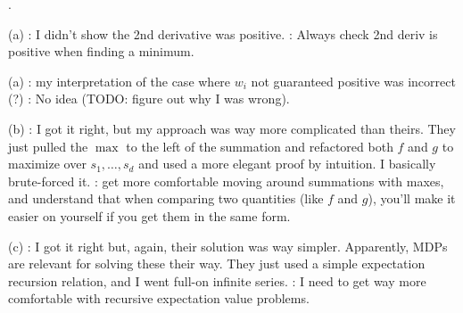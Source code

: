 \documentclass[11pt]{article}
\newcommand\myspace[1][]{\vspace{#1\bigskipamount}\Needspace{10\baselineskip}}
\newcommand\p{\Needspace{10\baselineskip} \noindent}
\begin{document}
\myspace
\p {}. 
\begin{compactitem}
	\item[(a)] : I didn't show the 2nd derivative was positive. : Always check 2nd deriv is positive when finding a minimum. 

	\item [(a)] : my interpretation of the case where $w_i$ not guaranteed positive was incorrect (?) : No idea (TODO: figure out why I was wrong). 
	
	\item [(b)] : I got it right, but my approach was way more complicated than theirs. They just pulled the $\max$ to the left of the summation and refactored both $f$ and $g$ to maximize over $s_1, \ldots, s_d$ and used a more elegant proof by intuition. I basically brute-forced it. : get more comfortable moving around summations with maxes, and understand that when comparing two quantities (like $f$ and $g$), you'll make it easier on yourself if you get them in the same form. 
	
	\item [(c)] : I got it right but, again, their solution was way simpler. Apparently, MDPs are relevant for solving these their way. They just used a simple expectation recursion relation, and I went full-on infinite series. : I need to get way more comfortable with recursive expectation value problems. 
\end{compactitem}
\end{document}

